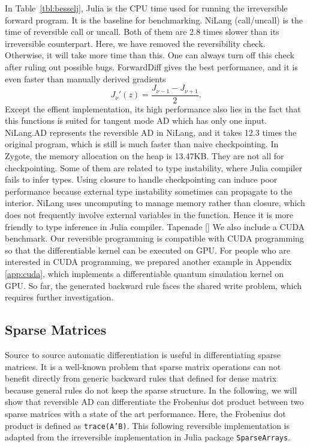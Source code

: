 \documentclass[aps,twocolumn,longbibliography,english,superscriptaddress]{revtex4-1}
\newcommand{\<}{\langle}
\renewcommand{\>}{\rangle}
\newcommand{\Tbl}[1]{Table~\ref{#1}}
\newcommand{\App}[1]{Appendix \ref{#1}}
\newcommand{\blue}[1]{[{\bf  \color{blue}{JG: #1}}]}
\theoremstyle{definition}\newtheorem{definition}{\textit{Definition}}
\begin{document}
In \Tbl{tbl:besselj}, Julia is the CPU time used for running the irreversible forward program. It is the baseline for benchmarking.
NiLang (call/uncall) is the time of reversible call or uncall. Both of them are 2.8 times slower than its irreversible counterpart. Here, we have removed the reversibility check. Otherwise, it will take more time than this. One can always turn off this check after ruling out possible bugs.
ForwardDiff gives the best performance, and it is even faster than manually derived gradients
\begin{equation}
    J_{\nu}'(z) = \frac{J_{\nu-1} - J_{\nu+1}}{2}.
\end{equation}
Except the effient implementation, its high performance also lies in the fact that this functions is suited for tangent mode AD which has only one input.
NiLang.AD represents the reversible AD in NiLang, and it takes 12.3 times the original program, which is still is much faster than naive checkpointing.
In Zygote, the memory allocation on the heap is 13.47KB. They are not all for checkpointing. Some of them are related to type instability, where Julia compiler fails to infer types.
Using closure to handle checkpointing can induce poor performance because external type instability sometimes can propagate to the interior.
NiLang uses uncomputing to manage memory rather than closure, which does not frequently involve external variables in the function.
Hence it is more friendly to type inference in Julia compiler.
Tapenade \blue{needs your effort, @MLS}
We also include a CUDA benchmark. Our reversible programming is compatible with CUDA programming so that the differentiable kernel can be executed on GPU.
For people who are interested in CUDA programming, we prepared another example in \App{app:cuda}, which implements a differentiable quantum simulation kernel on GPU.
So far, the generated backward rule faces the shared write problem, which requires further investigation.

\subsection{Sparse Matrices}
Source to source automatic differentiation is useful in differentiating sparse matrices. It is a well-known problem that sparse matrix operations can not benefit directly from generic backward rules that defined for dense matrix because general rules do not keep the sparse structure.
In the following, we will show that reversible AD can differentiate the Frobenius dot product between two sparse matrices with a state of the art performance. Here, the Frobenius dot product is defined as \texttt{trace(A'B)}.
This following reversible implementation is adapted from the irreversible implementation in Julia package \texttt{SparseArrays}.
\end{document}
